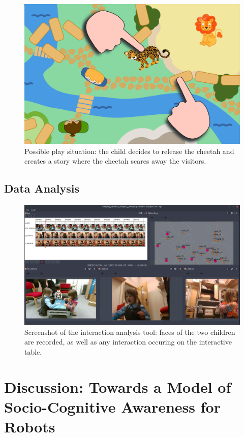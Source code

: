 \documentclass[a4paper]{article}
\begin{document}
\begin{figure}
    \centering
    \includegraphics[width=0.7\linewidth]{sandbox-release-cheetah}
    \caption{Possible play situation: the child decides to release the cheetah
    and creates a story where the cheetah scares away the visitors.}
    \label{}
\end{figure}

\subsection{Data Analysis}

\begin{figure}
    \centering
    \includegraphics[width=\linewidth]{analysis}
    \caption{Screenshot of the interaction analysis tool: faces of the two
    children are recorded, as well as any interaction occuring on the
    interactive table.}
    \label{fig|analysis}
\end{figure}

\section{Discussion: Towards a Model of Socio-Cognitive Awareness for Robots}
\end{document}
